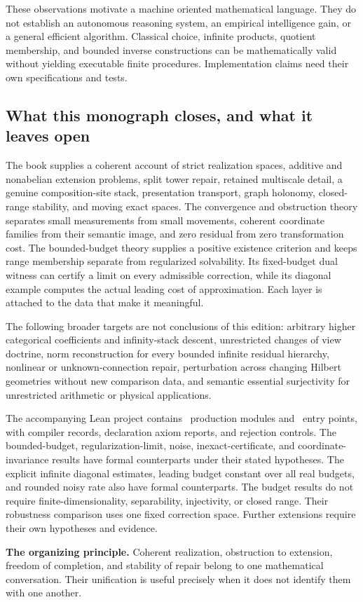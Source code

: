 These observations motivate a machine oriented mathematical language. They do not establish an autonomous reasoning system, an empirical intelligence gain, or a general efficient algorithm. Classical choice, infinite products, quotient membership, and bounded inverse constructions can be mathematically valid without yielding executable finite procedures. Implementation claims need their own specifications and tests.

\subsection{What this monograph closes, and what it leaves open}
The book supplies a coherent account of strict realization spaces, additive and nonabelian extension problems, split tower repair, retained multiscale detail, a genuine composition-site stack, presentation transport, graph holonomy, closed-range stability, and moving exact spaces. The convergence and obstruction theory separates small measurements from small movements, coherent coordinate families from their semantic image, and zero residual from zero transformation cost. The bounded-budget theory supplies a positive existence criterion and keeps range membership separate from regularized solvability. Its fixed-budget dual witness can certify a limit on every admissible correction, while its diagonal example computes the actual leading cost of approximation. Each layer is attached to the data that make it meaningful.

The following broader targets are not conclusions of this edition: arbitrary higher categorical coefficients and infinity-stack descent, unrestricted changes of view doctrine, norm reconstruction for every bounded infinite residual hierarchy, nonlinear or unknown-connection repair, perturbation across changing Hilbert geometries without new comparison data, and semantic essential surjectivity for unrestricted arithmetic or physical applications.

The accompanying Lean project contains \KSEditionProductionModules\ production modules and \KSEditionRoots\ entry points, with compiler records, declaration axiom reports, and rejection controls. The bounded-budget, regularization-limit, noise, inexact-certificate, and coordinate-invariance results have formal counterparts under their stated hypotheses. The explicit infinite diagonal estimates, leading budget constant over all real budgets, and rounded noisy rate also have formal counterparts. The budget results do not require finite-dimensionality, separability, injectivity, or closed range. Their robustness comparison uses one fixed correction space. Further extensions require their own hypotheses and evidence.

\begin{insight}
\textbf{The organizing principle.} Coherent realization, obstruction to extension, freedom of completion, and stability of repair belong to one mathematical conversation. Their unification is useful precisely when it does not identify them with one another.
\end{insight}


